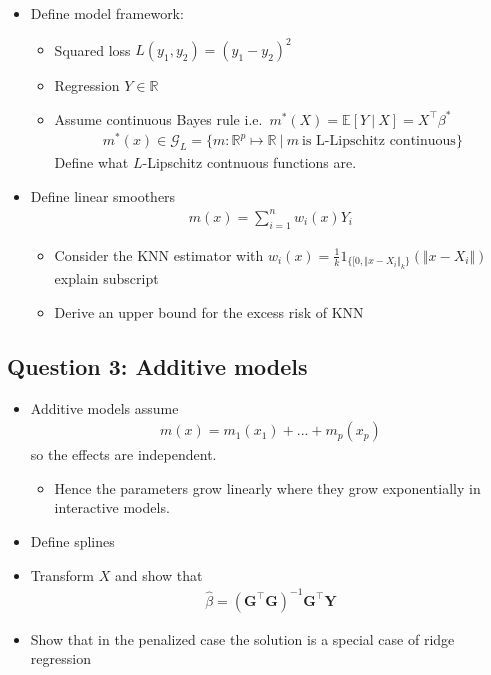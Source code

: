 \documentclass[a4paper,12pt,openany]{book}
\providecommand{\tightlist}{%
 \setlength{\itemsep}{0pt}\setlength{\parskip}{0pt}}
\begin{document}
\begin{itemize}
\tightlist
\item
  Define model framework:

  \begin{itemize}
  \tightlist
  \item
    Squared loss \(L(y_1,y_2)=(y_1-y_2)^2\)
  \item
    Regression \(Y\in \mathbb R\)
  \item
    Assume continuous Bayes rule i.e.~\(m^*(X)=\mathbb E[Y\ \vert\ X]=X^\top \beta^*\)
    \begin{align*}
    m^\ast(x)\in \mathcal G_L = \{m: \mathbb R^p \mapsto \mathbb R\ |\ m \ \text{is L-Lipschitz continuous}\}
    \end{align*}
    Define what \(L\)-Lipschitz contnuous functions are.
  \end{itemize}
\item
  Define linear smoothers
  \begin{align*}
    m(x)=\sum_{i=1}^nw_i(x) Y_i
    \end{align*}

  \begin{itemize}
  \tightlist
  \item
    Consider the KNN estimator with \(w_i(x)=\frac{1}{k}1_{\{[0,\Vert x-X_i\Vert_k\}}(\Vert x-X_i\Vert)\) explain subscript
  \item
    Derive an upper bound for the excess risk of KNN
  \end{itemize}
\end{itemize}

\hypertarget{question-3-additive-models}{%
\subsection{Question 3: Additive models}\label{question-3-additive-models}}

\begin{itemize}
\tightlist
\item
  Additive models assume
  \begin{align*}
    m(x)=m_1(x_1)+...+m_p(x_p)
    \end{align*}
  so the effects are independent.

  \begin{itemize}
  \tightlist
  \item
    Hence the parameters grow linearly where they grow exponentially in interactive models.
  \end{itemize}
\item
  Define splines
\item
  Transform \(X\) and show that
  \begin{align*}
    \hat\beta = (\mathbf G^\top \mathbf G)^{-1}\mathbf G^\top \mathbf Y
    \end{align*}
\item
  Show that in the penalized case the solution is a special case of ridge regression
\end{itemize}
\end{document}
